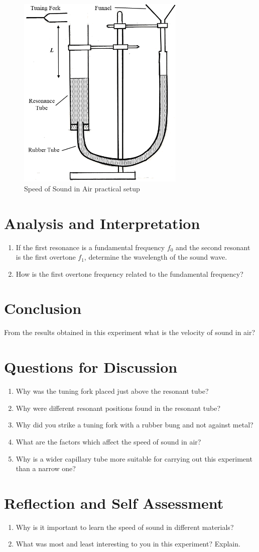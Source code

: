 \begin{figure}[h!]
\centering
\includegraphics[width=8cm]{./img/speed-of-sound-1.png}
\caption{Speed of Sound in Air practical setup}
\label{fig:speed-of-sound-1}
\end{figure}

\section{Analysis and Interpretation}
\begin{enumerate}
\item If the first resonance is a fundamental frequency $f_0$ and the second resonant is the first overtone $f_1$, determine the wavelength of the sound wave.
\item How is the first overtone frequency related to the fundamental frequency?
\end{enumerate}

\section{Conclusion}
From the results obtained in this experiment what is the velocity of sound in air?

\section{Questions for Discussion}
\begin{enumerate}
\item Why was the tuning fork placed just above the resonant tube?
\item Why were different resonant positions found in the resonant tube?
\item Why did you strike a tuning fork with a rubber bung and not against metal?
\item What are the factors which affect the speed of sound in air?
\item Why is a wider capillary tube more suitable for carrying out this experiment than a narrow one?
\end{enumerate}

\section{Reflection and Self Assessment}
\begin{enumerate}
\item Why is it important to learn the speed of sound in different materials?
\item What was most and least interesting to you in this experiment? Explain.
\end{enumerate}